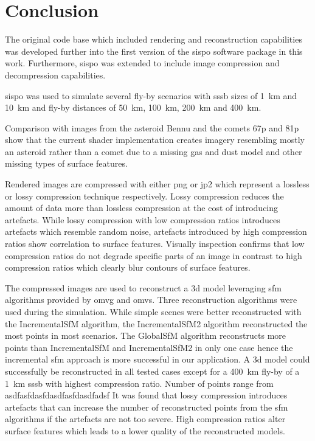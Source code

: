 \section{Conclusion} \label{sec:conclusion}
The original code base which included rendering and reconstruction capabilities was developed further into the first version of the \gls{sispo} software package in this work. Furthermore, \gls{sispo} was extended to include image compression and decompression capabilities.

\Gls{sispo} was used to simulate several fly-by scenarios with \gls{sssb} sizes of \SI{1}{\kilo\meter} and \SI{10}{\kilo\meter} and fly-by distances of \SI{50}{\kilo\meter}, \SI{100}{\kilo\meter}, \SI{200}{\kilo\meter} and \SI{400}{\kilo\meter}.

Comparison with images from the asteroid Bennu and the comets \gls{67p} and \gls{81p} show that the current shader implementation creates imagery resembling mostly an asteroid rather than a comet due to a missing gas and dust model and other missing types of surface features.

Rendered images are compressed with either \gls{png} or \gls{jp2} which represent a lossless or lossy compression technique respectively. Lossy compression reduces the amount of data more than lossless compression at the cost of introducing artefacts. While lossy compression with low compression ratios introduces artefacts which resemble random noise, artefacts introduced by high compression ratios show correlation to surface features. Visually inspection confirms that low compression ratios do not degrade specific parts of an image in contrast to high compression ratios which clearly blur contours of surface features.

The compressed images are used to reconstruct a \gls{3d} model leveraging \gls{sfm} algorithms provided by \gls{omvg} and \gls{omvs}. Three reconstruction algorithms were used during the simulation. While simple scenes were better reconstructed with the IncrementalSfM algorithm, the IncrementalSfM2 algorithm reconstructed the most points in most scenarios. The GlobalSfM algorithm reconstructs more points than IncrementalSfM and IncrementalSfM2 in only one case hence the incremental \gls{sfm} approach is more successful in our application. A \gls{3d} model could successfully be reconstructed in all tested cases except for a \SI{400}{\kilo\meter} fly-by of a \SI{1}{\kilo\meter} \gls{sssb} with highest compression ratio. Number of points range from asdfasfdasfdasdfasfdasdfadsf It was found that lossy compression introduces artefacts that can increase the number of reconstructed points from the \gls{sfm} algorithms if the artefacts are not too severe. High compression ratios alter surface features which leads to a lower quality of the reconstructed models. 

